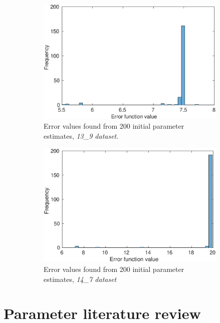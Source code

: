 \documentclass[10pt,journal]{./IEEE_latex_class/IEEEtran}
\begin{document}
\begin{figure}[H]
    \begin{subfigure}[c]{\textwidth}
    \centering
        \includegraphics[scale = 0.5]{13_9_f_hist}
        \caption{Error values found from 200 initial parameter estimates, \textit{13\_9 dataset}.}
    \end{subfigure}
    
    \begin{subfigure}[c]{\textwidth}
    \centering
        \includegraphics[scale = 0.5]{14_7_f_hist}
        \caption{Error values found from 200 initial parameter estimates, \textit{14\_7 dataset}}
    \end{subfigure}
    \caption{}
\label{hist_f}
\end{figure} 


\section{Parameter literature review}
\label{Parameter literature review}
\setcounter{figure}{0}    
\end{document}
